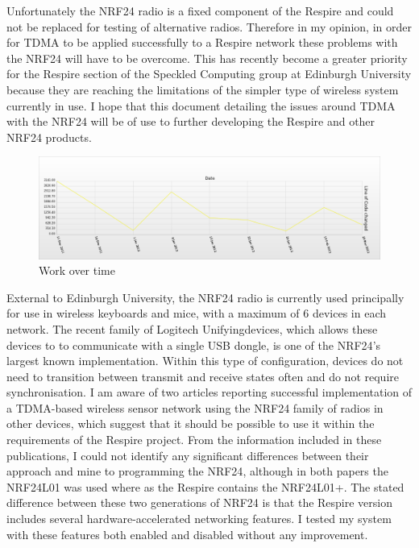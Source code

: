 Unfortunately the \ac{NRF24} radio is a fixed component of the Respire and could
not be replaced for testing of alternative radios. Therefore in my opinion, in order
for \ac{TDMA} to be applied successfully to a Respire network these problems with
the \ac{NRF24} will have to be overcome. This has recently become a greater priority
for the Respire section of the Speckled Computing group at Edinburgh University
because they are reaching the limitations of the simpler type of wireless system
currently in use.  I hope that this document detailing the issues around \ac{TDMA}
with the \ac{NRF24} will be of use to further developing the Respire and other
\ac{NRF24} products.

\begin{figure}[htb]
  \centering
  \includegraphics[width=\textwidth, keepaspectratio=true]{images/git_work_time.png}
  \caption{Work over time}
  \label{fig:git_work_time}
\end{figure}

External to Edinburgh University, the \ac{NRF24} radio is currently used principally for use in wireless
keyboards and mice, with a maximum of 6 devices in each network. The recent family of Logitech
Unifying\textregistered devices, which allows these devices to to communicate with a single \ac{USB}
dongle, is one of the \ac{NRF24}'s largest known implementation. Within this type of configuration, devices do not need
to transition between transmit and receive states often and do not require synchronisation. I am
aware of two articles reporting successful implementation of a TDMA-based wireless sensor network
using the \ac{NRF24} family of radios \cite{GossipingMAC, DecentralizedTDMA} in other devices, which suggest that it should be possible to
use it within the requirements of the Respire project. From the information included in these
publications, I could not identify any significant differences between their approach and mine to
programming the \ac{NRF24}, although in both papers the NRF24L01 was used where as the Respire
contains the NRF24L01+. The stated difference between these two generations of \ac{NRF24} is that the
Respire version includes several hardware-accelerated networking features. I tested my system with
these features both enabled and disabled without any improvement.


